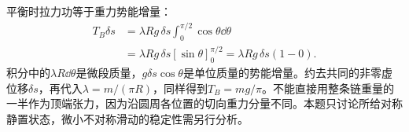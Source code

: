 \begin{solution}
平衡时拉力功等于重力势能增量：
\[
 \begin{aligned}
 T_B\delta s
 &=\lambda Rg\,\delta s\int_0^{\pi/2}\cos\theta\dd\theta\\
 &=\lambda Rg\,\delta s[\sin\theta]_0^{\pi/2}
 =\lambda Rg\,\delta s(1-0).
 \end{aligned}
\]
积分中的$\lambda R\dd\theta$是微段质量，$g\delta s\cos\theta$是单位质量的势能增量。约去共同的非零虚位移$\delta s$，再代入$\lambda=m/(\pi R)$，同样得到$T_B=mg/\pi$。不能直接用整条链重量的一半作为顶端张力，因为沿圆周各位置的切向重力分量不同。本题只讨论所给对称静置状态，微小不对称滑动的稳定性需另行分析。

\end{solution}
